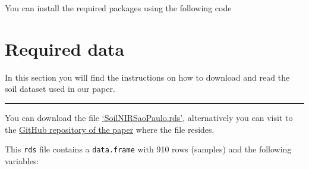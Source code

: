 \documentclass[]{book}
\newenvironment{Shaded}{\begin{snugshade}}{\end{snugshade}}
\newcommand{\ControlFlowTok}[1]{\textcolor[rgb]{0.13,0.29,0.53}{\textbf{#1}}}
\newcommand{\DataTypeTok}[1]{\textcolor[rgb]{0.13,0.29,0.53}{#1}}
\newcommand{\DecValTok}[1]{\textcolor[rgb]{0.00,0.00,0.81}{#1}}
\newcommand{\KeywordTok}[1]{\textcolor[rgb]{0.13,0.29,0.53}{\textbf{#1}}}
\newcommand{\NormalTok}[1]{#1}
\newcommand{\OperatorTok}[1]{\textcolor[rgb]{0.81,0.36,0.00}{\textbf{#1}}}
\newcommand{\OtherTok}[1]{\textcolor[rgb]{0.56,0.35,0.01}{#1}}
\newcommand{\StringTok}[1]{\textcolor[rgb]{0.31,0.60,0.02}{#1}}
\begin{document}
You can install the required packages using the following code

\begin{Shaded}
\end{Shaded}

\hypertarget{required-data}{%
\chapter{Required data}\label{required-data}}

In this section you will find the instructions on how to download and read the soil dataset used in our paper.

\begin{center}\rule{0.5\linewidth}{\linethickness}\end{center}

You can download the file \href{https://github.com/l-ramirez-lopez/VNIR_spectroscopy_for_robust_soil_mapping/raw/master/SoilNIRSaoPaulo.rds}{`SoilNIRSaoPaulo.rds'}, alternatively you can visit to the \href{https://github.com/l-ramirez-lopez/VNIR_spectroscopy_for_robust_soil_mapping}{GitHub repository of the paper} where the file resides.

This \texttt{rds} file contains a \texttt{data.frame} with 910 rows (samples) and the following variables:
\end{document}
